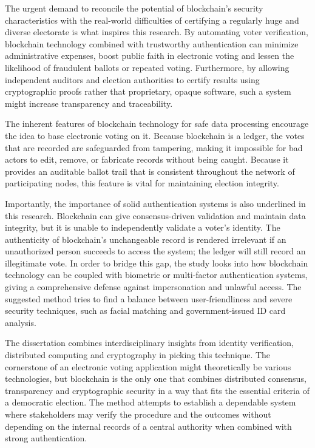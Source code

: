 \documentclass[a4paper,10pt]{report}
\begin{document}
 The urgent demand to reconcile the potential of blockchain’s security characteristics with the real-world difficulties of certifying a regularly huge and diverse electorate is what inspires this research.  By automating voter verification, blockchain technology combined with trustworthy authentication can minimize administrative expenses, boost public faith in electronic voting and lessen the likelihood of fraudulent ballots or repeated voting.  Furthermore, by allowing independent auditors and election authorities to certify results using cryptographic proofs rather that proprietary, opaque software, such a system might increase transparency and traceability.
 
 The inherent features of blockchain technology for safe data processing encourage the idea to base electronic voting on it.  Because blockchain is a ledger, the votes that are recorded are safeguarded from tampering, making it impossible for bad actors to edit, remove, or fabricate records without being caught.  Because it provides an auditable ballot trail that is consistent throughout the network of participating nodes, this feature is vital for maintaining election integrity.
 
 Importantly, the importance of solid authentication systems is also underlined in this research.  Blockchain can give consensus-driven validation and maintain data integrity, but it is unable to independently validate a voter’s identity.  The authenticity of blockchain’s unchangeable record is rendered irrelevant if an unauthorized person succeeds to access the system; the ledger will still record an illegitimate vote.  In order to bridge this gap, the study looks into how blockchain technology can be coupled with biometric or multi-factor authentication systems, giving a comprehensive defense against impersonation and unlawful access.  The suggested method tries to find a balance between user-friendliness and severe security techniques, such as facial matching and government-issued ID card analysis.
 
 The dissertation combines interdisciplinary insights from identity verification, distributed computing and cryptography in picking this technique.  The cornerstone of an electronic voting application might theoretically be various technologies, but blockchain is the only one that combines distributed consensus, transparency and cryptographic security in a way that fits the essential criteria of a democratic election.  The method attempts to establish a dependable system where stakeholders may verify the procedure and the outcomes without depending on the internal records of a central authority when combined with strong authentication.
 
\end{document}
